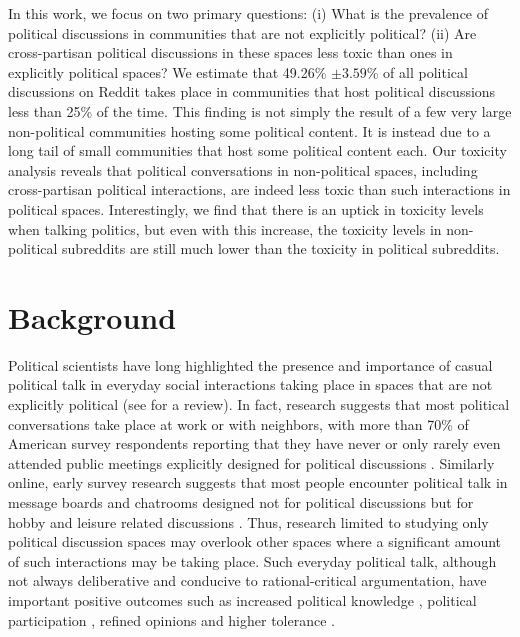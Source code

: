 \documentclass[letterpaper]{article} %
\begin{document}
In this work, we focus on two primary questions: (i) What is the prevalence of political discussions in communities that are not explicitly political? (ii) Are cross-partisan political discussions in these spaces less toxic than ones in explicitly political spaces? We estimate that 49.26\% $\pm 3.59$\%  of all political discussions on Reddit takes place in communities that host political discussions less than 25\% of the time. This finding is not simply the result of a few very large non-political communities hosting some political content. It is instead due to a long tail of small communities that host some political content each.
Our toxicity analysis reveals that political conversations in non-political spaces, including cross-partisan political interactions, are indeed less toxic than such interactions in political spaces. Interestingly, we find that there is an uptick in toxicity levels when talking politics, but even with this increase, the toxicity levels in non-political subreddits are still much lower than the toxicity in political subreddits.


\section{Background}

Political scientists have long highlighted the presence and importance of casual political talk in everyday social interactions taking place in spaces that are not explicitly political (see \cite{conover2018taking} for a review). In fact, research suggests that most political conversations take place at work or with neighbors, with more than 70\% of American survey respondents reporting that they have never or only rarely even attended public meetings explicitly designed for political discussions \cite{conover2002deliberative}. Similarly online, early survey research suggests that most people encounter political talk in message boards and chatrooms designed not for political discussions but for hobby and leisure related discussions \cite{wojcieszak2009online}. Thus, research limited to studying only political discussion spaces may overlook other spaces where a significant amount of such interactions may be taking place. Such everyday political talk, although not always deliberative and conducive to rational-critical argumentation, have important positive outcomes such as increased political knowledge \cite{pattie2008s}, political participation \cite{searing2007public}, refined opinions \cite{kim2008theorizing} and higher tolerance \cite{pattie2008s,mutz2006hearing}.
\end{document}
